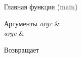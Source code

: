 Главная функция (main) 
\begin{DoxyParams}{Аргументы}
{\em argc} & \\
\hline
{\em argv} & \\
\hline
\end{DoxyParams}
\begin{DoxyReturn}{Возвращает}

\end{DoxyReturn}
